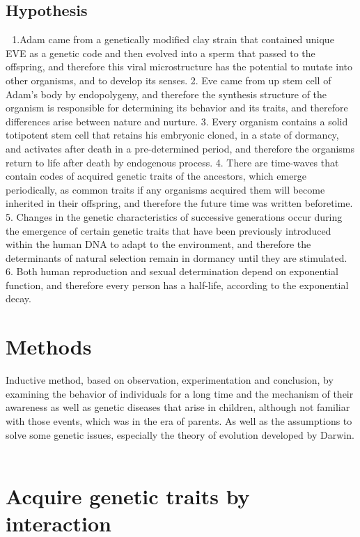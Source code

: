 \begin{Summary}
\subsection{Hypothesis} 
1.Adam came from a genetically modified clay strain that contained unique EVE as a genetic code and then evolved into a sperm that passed to the offspring, and therefore this viral microstructure has the potential to mutate into other organisms, and to develop its senses.
2. Eve came from up stem cell of Adam's body by endopolygeny, and therefore the synthesis structure of the organism is responsible for determining its behavior and its traits, and therefore differences arise between nature and nurture.
3. Every organism contains a solid totipotent stem cell that retains his embryonic cloned, in a state of dormancy, and activates after death in a pre-determined period, and therefore the organisms return to life after death by endogenous process.
4. There are time-waves that contain codes of acquired genetic traits of the ancestors, which emerge periodically, as common traits if any organisms acquired them will become inherited in their offspring, and therefore the future time was written beforetime.
5. Changes in the genetic characteristics of successive generations occur during the emergence of certain genetic traits that have been previously introduced within the human DNA to adapt to the environment, and therefore the determinants of natural selection remain in dormancy until they are stimulated.
6. Both human reproduction and sexual determination depend on exponential function, and therefore every person has a half-life, according to the exponential decay.
 
\section{Methods}
Inductive method, based on observation, experimentation and conclusion, by examining the behavior of individuals for a long time and the mechanism of their awareness as well as genetic diseases that arise in children, although not familiar with those events, which was in the era of parents. As well as the assumptions to solve some genetic issues, especially the theory of evolution developed by Darwin.
 
\section{Acquire genetic traits by interaction}


\end{Summary}
